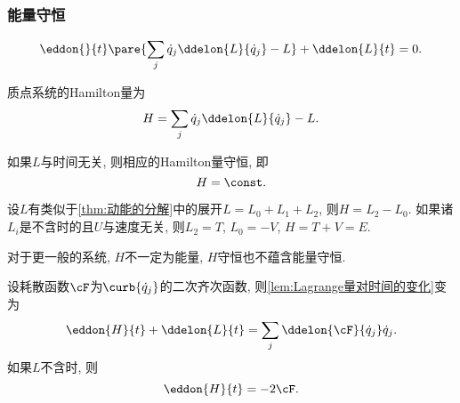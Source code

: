 \documentclass[../TheoreticalMechanics.tex]{subfiles}
\begin{document}

\subsubsection{能量守恒} %
\label{ssub:能量守恒}

\begin{lemma}[Lagrange量对时间的变化]\quad
	\label{lem:Lagrange量对时间的变化}
	\[ \eddon{}{t}\pare{\sum_j \dot{q}_j\ddelon{L}{\dot{q}_j}-L}+\ddelon{L}{t} = 0. \]
\end{lemma}
\begin{finale}
	\begin{definition}[Hamilton量]
		质点系统的Hamilton量为
		\[ H = \sum_j \dot{q}_j\ddelon{L}{\dot{q}_j} - L. \]
	\end{definition}
	\begin{corollary}[能量守恒]
		如果$L$与时间无关, 则相应的Hamilton量守恒, 即
		\[ H = \const. \]
	\end{corollary}
\end{finale}
\begin{corollary}[Hamilton量的意义]
	设$L$有类似于\cref{thm:动能的分解}中的展开$L=L_0 + L_1 + L_2$, 则$H = L_2 - L_0$. 如果诸$L_i$是不含时的且$U$与速度无关, 则$L_2 = T$, $L_0 = -V$, $H = T + V = E$.
\end{corollary}
\begin{pitfall}
	对于更一般的系统, $H$不一定为能量, $H$守恒也不蕴含能量守恒.
\end{pitfall}
\begin{corollary}[耗散函数与Hamilton量]
	设耗散函数$\cF$为$\curb{\dot{q}_j}$的二次齐次函数, 则\cref{lem:Lagrange量对时间的变化}变为
	\[ \eddon{H}{t} + \ddelon{L}{t} = \sum_j \ddelon{\cF}{\dot{q}_j}\dot{q}_j. \]
	如果$L$不含时, 则
	\[ \eddon{H}{t} = -2\cF. \]
\end{corollary}



\end{document}
